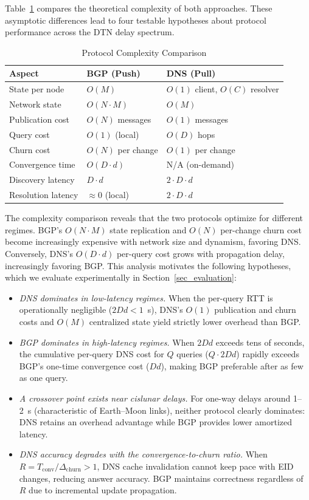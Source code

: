 \documentclass[journal,twocolumn]{IEEEtran}
\begin{document}
Table~\ref{tab:complexity} compares the theoretical complexity of both approaches. 
These asymptotic differences lead to four testable hypotheses about protocol performance across the DTN delay spectrum.

\begin{table}[t]
\centering
\caption{Protocol Complexity Comparison}
\label{tab:complexity}
\begin{tabular}{@{}lll@{}}
\toprule
\textbf{Aspect} & \textbf{BGP (Push)} & \textbf{DNS (Pull)} \\
\midrule
State per node & $O(M)$ & $O(1)$ client, $O(C)$ resolver \\
Network state & $O(N \cdot M)$ & $O(M)$ \\
Publication cost & $O(N)$ messages & $O(1)$ messages \\
Query cost & $O(1)$ (local) & $O(D)$ hops \\
Churn cost & $O(N)$ per change & $O(1)$ per change \\
Convergence time & $O(D \cdot d)$ & N/A (on-demand) \\
Discovery latency & $D \cdot d$ & $2 \cdot D \cdot d$ \\
Resolution latency & $\approx 0$ (local) & $2 \cdot D \cdot d$ \\
\bottomrule
\end{tabular}
\end{table}

The complexity comparison reveals that the two protocols optimize for different regimes. 
BGP's $O(N \cdot M)$ state replication and $O(N)$ per-change churn cost become increasingly expensive with network size and dynamism, favoring DNS. 
Conversely, DNS's $O(D \cdot d)$ per-query cost grows with propagation delay, increasingly favoring BGP. 
This analysis motivates the following hypotheses, which we evaluate experimentally in Section~\ref{sec_evaluation}:

\begin{itemize}
    \item[\textbf{H1}:] \emph{DNS dominates in low-latency regimes.} When the per-query RTT is operationally negligible ($2Dd < 1$~s), DNS's $O(1)$ publication and churn costs and $O(M)$ centralized state yield strictly lower overhead than BGP.
    \item[\textbf{H2}:] \emph{BGP dominates in high-latency regimes.} When $2Dd$ exceeds tens of seconds, the cumulative per-query DNS cost for $Q$ queries ($Q \cdot 2Dd$) rapidly exceeds BGP's one-time convergence cost ($Dd$), making BGP preferable after as few as one query.
    \item[\textbf{H3}:] \emph{A crossover point exists near cislunar delays.} For one-way delays around 1--2~s (characteristic of Earth--Moon links), neither protocol clearly dominates: DNS retains an overhead advantage while BGP provides lower amortized latency.
    \item[\textbf{H4}:] \emph{DNS accuracy degrades with the convergence-to-churn ratio.} When $R = T_{\text{conv}} / \Delta_{\text{churn}} > 1$, DNS cache invalidation cannot keep pace with EID changes, reducing answer accuracy. BGP maintains correctness regardless of~$R$ due to incremental update propagation.
\end{itemize}
\end{document}
